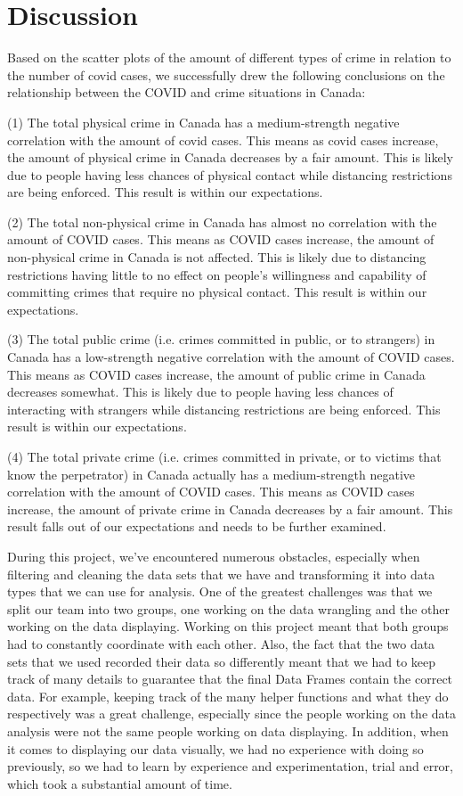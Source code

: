 \documentclass[fontsize=11pt]{article}
\begin{document}
\section{Discussion}
Based on the scatter plots of the amount of different types of crime in relation to the number of covid cases, we successfully drew the following conclusions on the relationship between the COVID and crime situations in Canada:

(1) The total physical crime in Canada has a medium-strength negative correlation with the amount of covid cases. This means as covid cases increase, the amount of physical crime in Canada decreases by a fair amount. This is likely due to people having less chances of physical contact while distancing restrictions are being enforced. This result is within our expectations.

(2) The total non-physical crime in Canada has almost no correlation with the amount of COVID cases. This means as COVID cases increase, the amount of non-physical crime in Canada is not affected. This is likely due to distancing restrictions having little to no effect on people's willingness and capability of committing crimes that require no physical contact. This result is within our expectations.

(3) The total public crime (i.e. crimes committed in public, or to strangers) in Canada has a low-strength negative correlation with the amount of COVID cases. This means as COVID cases increase, the amount of public crime in Canada decreases somewhat. This is likely due to people having less chances of interacting with strangers while distancing restrictions are being enforced. This result is within our expectations.

(4) The total private crime (i.e. crimes committed in private, or to victims that know the perpetrator) in Canada actually has a medium-strength negative correlation with the amount of COVID cases. This means as COVID cases increase, the amount of private crime in Canada decreases by a fair amount. This result falls out of our expectations and needs to be further examined.

During this project, we've encountered numerous obstacles, especially when filtering and cleaning the data sets that we have and transforming it into data types that we can use for analysis. One of the greatest challenges was that we split our team into two groups, one working on the data wrangling and the other working on the data displaying. Working on this project meant that both groups had to constantly coordinate with each other. Also, the fact that the two data sets that we used recorded their data so differently meant that we had to keep track of many details to guarantee that the final Data Frames contain the correct data. For example, keeping track of the many helper functions and what they do respectively was a great challenge, especially since the people working on the data analysis were not the same people working on data displaying. In addition, when it comes to displaying our data visually, we had no experience with doing so previously, so we had to learn by experience and experimentation, trial and error, which took a substantial amount of time.
\end{document}
